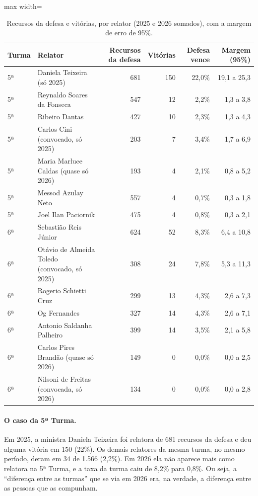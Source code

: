 \begin{table}[h]
\centering\small
\caption{Recursos da defesa e vitórias, por relator (2025 e 2026 somados), com a margem de erro de 95\%.}
\label{tab:dados-relator}
\begin{adjustbox}{max width=\textwidth}
\begin{tabular}{llrrrr}
\toprule
Turma & Relator & Recursos da defesa & Vitórias & Defesa vence & Margem (95\%) \\
\midrule
5ª & Daniela Teixeira (só 2025) & 681 & 150 & 22,0\% & 19,1 a 25,3 \\
5ª & Reynaldo Soares da Fonseca & 547 & 12 & 2,2\% & 1,3 a 3,8 \\
5ª & Ribeiro Dantas & 427 & 10 & 2,3\% & 1,3 a 4,3 \\
5ª & Carlos Cini (convocado, só 2025) & 203 & 7 & 3,4\% & 1,7 a 6,9 \\
5ª & Maria Marluce Caldas (quase só 2026) & 193 & 4 & 2,1\% & 0,8 a 5,2 \\
5ª & Messod Azulay Neto & 557 & 4 & 0,7\% & 0,3 a 1,8 \\
5ª & Joel Ilan Paciornik & 475 & 4 & 0,8\% & 0,3 a 2,1 \\
\midrule
6ª & Sebastião Reis Júnior & 624 & 52 & 8,3\% & 6,4 a 10,8 \\
6ª & Otávio de Almeida Toledo (convocado, só 2025) & 308 & 24 & 7,8\% & 5,3 a 11,3 \\
6ª & Rogerio Schietti Cruz & 299 & 13 & 4,3\% & 2,6 a 7,3 \\
6ª & Og Fernandes & 327 & 14 & 4,3\% & 2,6 a 7,1 \\
6ª & Antonio Saldanha Palheiro & 399 & 14 & 3,5\% & 2,1 a 5,8 \\
6ª & Carlos Pires Brandão (quase só 2026) & 149 & 0 & 0,0\% & 0,0 a 2,5 \\
6ª & Nilsoni de Freitas (convocada, só 2026) & 134 & 0 & 0,0\% & 0,0 a 2,8 \\
\bottomrule
\end{tabular}
\end{adjustbox}
\end{table}

\paragraph*{O caso da 5ª Turma.} Em 2025, a ministra Daniela Teixeira foi relatora de 681
recursos da defesa e deu alguma vitória em 150 (22\%). Os demais relatores da mesma turma, no
mesmo período, deram em 34 de 1.566 (2,2\%). Em 2026 ela não aparece mais como relatora na
5ª Turma, e a taxa da turma caiu de 8,2\% para 0,8\%. Ou seja, a ``diferença entre as turmas''
que se via em 2026 era, na verdade, a diferença entre as pessoas que as compunham.

